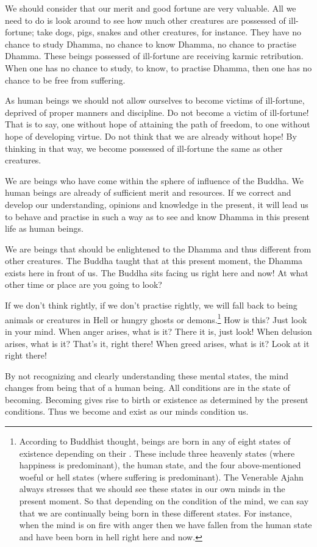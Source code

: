We should consider that our merit and good fortune are very valuable. All we need to do is look around to see how much other creatures are possessed of ill-fortune; take dogs, pigs, snakes and other creatures, for instance. They have no chance to study Dhamma, no chance to know Dhamma, no chance to practise Dhamma. These beings possessed of ill-fortune are receiving karmic retribution. When one has no chance to study, to know, to practise Dhamma, then one has no chance to be free from suffering. 

As human beings we should not allow ourselves to become victims of ill-fortune, deprived of proper manners and discipline. Do not become a victim of ill-fortune! That is to say, one without hope of attaining the path of freedom, to  one without hope of developing virtue. Do not think that we are already without hope! By thinking in that way, we become possessed of ill-fortune the same as other creatures. 

We are beings who have come within the sphere of influence of the Buddha. We human beings are already of sufficient merit and resources. If we correct and develop our understanding, opinions and knowledge in the present, it will lead us to behave and practise in such a way as to see and know Dhamma in this present life as human beings. 

We are beings that should be enlightened to the Dhamma and thus different from other creatures. The Buddha taught that at this present moment, the Dhamma exists here in front of us. The Buddha sits facing us right here and now! At what other time or place are you going to look?

If we don't think rightly, if we don't practise rightly, we will fall back to being animals or creatures in Hell or hungry ghosts or demons.\footnote{According to Buddhist thought, beings are born in any of eight states of existence depending on their . These include three heavenly states (where happiness is predominant), the human state, and the four above-mentioned woeful or hell states (where suffering is predominant). The Venerable Ajahn always stresses that we should see these states in our own minds in the present moment. So that depending on the condition of the mind, we can say that we are continually being born in these different states. For instance, when the mind is on fire with anger then we have fallen from the human state and have been born in hell right here and now.} How is this? Just look in your mind. When anger arises, what is it? There it is, just look! When delusion arises, what is it? That's it, right there! When greed arises, what is it? Look at it right there! 

By not recognizing and clearly understanding these mental states, the mind changes from being that of a human being. All conditions are in the state of becoming. Becoming gives rise to birth or existence as determined by the present conditions. Thus we become and exist as our minds condition us.

